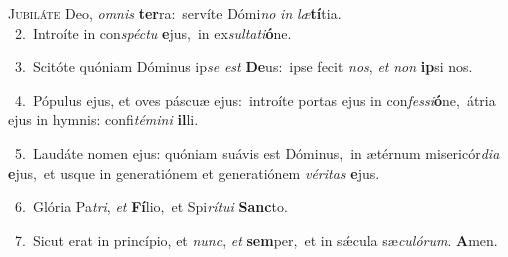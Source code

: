 \lettrine{\initial\textcolor{\initialcolor}{J}}{ubiláte} Deo, \textit{om}\-\textit{nis} \textbf{ter}\-ra:~\star servíte Dómi\textit{no} \textit{in} \textit{læ}\-\textbf{tí}tia.\\
{\numbfont\textcolor{\numbcolor}{~2.}}~Introíte in con\-\textit{spéc}\-\textit{tu} \textbf{e}\-jus,~\star in ex\-\textit{sul}\-\textit{ta}\textit{ti}\textbf{ó}ne.\par
{\numbfont\textcolor{\numbcolor}{~3.}}~Scitóte quóniam Dóminus ip\textit{se} \textit{est} \textbf{De}\-us:~\star ipse fecit \textit{nos}\-, \textit{et} \textit{non} \textbf{ip}\-si nos.\par
{\numbfont\textcolor{\numbcolor}{~4.}}~Pópulus ejus, et oves páscuæ ejus:~\dagger introíte portas ejus in con\-\textit{fes}\-\textit{si}\textbf{ó}ne,~\star átria ejus in hymnis: confi\-\textit{té}\-\textit{mi}\textit{ni} \textbf{il}\-li.\par
{\numbfont\textcolor{\numbcolor}{~5.}}~Laudáte nomen ejus: quóniam suávis est Dóminus,~\dagger in ætérnum misericór\-\textit{di}\-\textit{a} \textbf{e}\-jus,~\star et usque in generatiónem et generatiónem \textit{vé}\-\textit{ri}\textit{tas} \textbf{e}\-jus.\par
{\numbfont\textcolor{\numbcolor}{~6.}}~Glória Pa\-\textit{tri}\-, \textit{et} \textbf{Fí}\-lio,~\star et Spi\-\textit{rí}\-\textit{tu}\textit{i} \textbf{Sanc}\-to.\par
{\numbfont\textcolor{\numbcolor}{~7.}}~Sicut erat in princípio, et \textit{nunc}\-, \textit{et} \textbf{sem}\-per,~\star et in sǽcula sæ\-\textit{cu}\-\textit{ló}\textit{rum}. \textbf{A}\-men.\par

